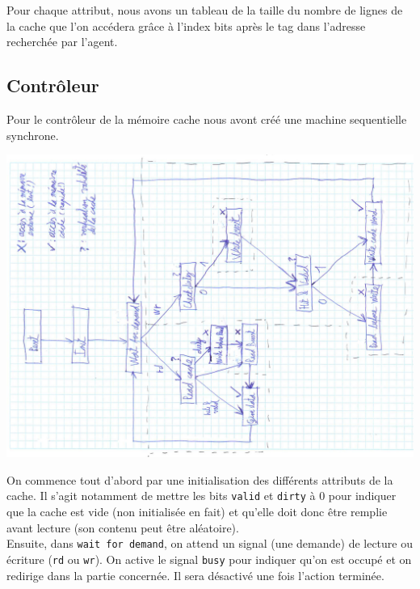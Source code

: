 \documentclass[10pt,a4paper]{article}
\begin{document}
Pour chaque attribut, nous avons un tableau de la taille du nombre de lignes de la cache que l'on accédera grâce à l'index bits après le tag dans l'adresse recherchée par l'agent.

\newpage

\subsection{Contrôleur}
Pour le contrôleur de la mémoire cache nous avont créé une machine sequentielle synchrone.

\begin{center}

\includegraphics[width=1.3\textwidth, angle=-90]{images/mss}

\end{center}

\newpage

On commence tout d'abord par une initialisation des différents attributs de la cache. Il s'agit notamment de mettre les bits \texttt{valid} et \texttt{dirty} à 0 pour indiquer que la cache est vide (non initialisée en fait) et qu'elle doit donc être remplie avant lecture (son contenu peut être aléatoire).\\

Ensuite, dans \texttt{wait for demand}, on attend un signal (une demande) de lecture ou écriture (\texttt{rd} ou \texttt{wr}). On active le signal \texttt{busy} pour indiquer qu'on est occupé et on redirige dans la partie concernée. Il sera désactivé une fois l'action terminée.
\end{document}
